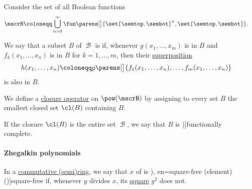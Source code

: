 \begin{definition}\label{def:boolean_closure}
  Consider the set of all Boolean functions
  \begin{equation*}
    \mscrB \coloneqq \bigcup_{n=0}^\infty \fun \parens[\big]{ \set{ \semtop, \sembot }^n, \set{ \semtop, \sembot } }.
  \end{equation*}

  \begin{thmenum}
     We say that a subset \( B \) of \( \mscrB \) is  if, whenever \( g(x_1, \ldots, x_m) \) is in \( B \) and \( f_k(x_1, \ldots, x_n) \) is in \( B \) for \( k = 1, \ldots, m \), then their \hyperref[def:function_superposition]{superposition}
    \begin{equation*}
      h(x_1, \ldots, x_n) \coloneqq g\parens[\big]{ f_1(x_1, \ldots, x_n), \ldots, f_m(x_1, \ldots, x_n) }
    \end{equation*}
    is also in \( B \).

     We define a \hyperref[def:abstract_closure_operator]{closure operator} on \( \pow(\mscrB) \) by assigning to every set \( B \) the smallest closed set \( \cl(B) \) containing \( B \).

     If the closure \( \cl(B) \) is the entire set \( \mscrB \), we say that \( B \) is \term[ru=полная система, en=functionally complete (\cite[857]{Rosen2019DiscreteMathematics})]{functionally complete}.
  \end{thmenum}
\end{definition}

\paragraph{Zhegalkin polynomials}

\begin{definition}\label{def:square_free_element}
   In a \hyperref[def:ring/commutative]{commutative (semi)ring}, we say that \( x \) of is \term[ru=свободное от квадратов (число) (\cite[def. 93]{Бухштаб1966ТеорияЧисел}), en=square-free (element) (\cite[79]{JędrzejewiczEtAl2017SquareFreeFactorization})]{square-free} if, whenever \( y \) divides \( x \), its \hyperref[def:semigroup_power]{square} \( y^2 \) does not.
\end{definition}

